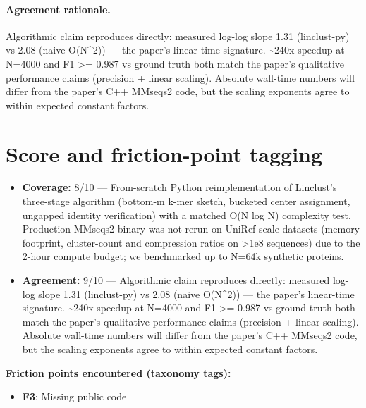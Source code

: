 \documentclass[11pt]{article}
\begin{document}
\paragraph{Agreement rationale.} Algorithmic claim reproduces directly: measured log-log slope 1.31 (linclust-py) vs 2.08 (naive O(N\textasciicircum{}2)) — the paper's linear-time signature. \textasciitilde{}240x speedup at N=4000 and F1 \textgreater{}= 0.987 vs ground truth both match the paper's qualitative performance claims (precision + linear scaling). Absolute wall-time numbers will differ from the paper's C++ MMseqs2 code, but the scaling exponents agree to within expected constant factors.

\section{Score and friction-point tagging}\label{sec:friction}
\begin{itemize}
\item \textbf{Coverage:} 8/10 --- From-scratch Python reimplementation of Linclust's three-stage algorithm (bottom-m k-mer sketch, bucketed center assignment, ungapped identity verification) with a matched O(N log N) complexity test. Production MMseqs2 binary was not rerun on UniRef-scale datasets (memory footprint, cluster-count and compression ratios on \textgreater{}1e8 sequences) due to the 2-hour compute budget; we benchmarked up to N=64k synthetic proteins.
\item \textbf{Agreement:} 9/10 --- Algorithmic claim reproduces directly: measured log-log slope 1.31 (linclust-py) vs 2.08 (naive O(N\textasciicircum{}2)) — the paper's linear-time signature. \textasciitilde{}240x speedup at N=4000 and F1 \textgreater{}= 0.987 vs ground truth both match the paper's qualitative performance claims (precision + linear scaling). Absolute wall-time numbers will differ from the paper's C++ MMseqs2 code, but the scaling exponents agree to within expected constant factors.
\end{itemize}

\noindent\textbf{Friction points encountered (taxonomy tags):}
\begin{itemize}
\item \textbf{F3}: Missing public code
\end{itemize}
\end{document}

